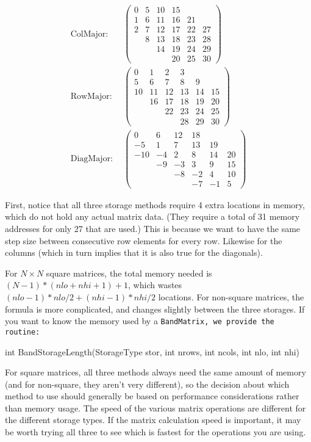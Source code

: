 \begin{align*}
\textrm{ColMajor:} ~ ~ & \left(\begin{array}{cccccc}0 & 5 & 10 & 15 &  &  \\1 & 6 & 11 & 16 & 21 &  \\2 & 7 & 12 & 17 & 22 & 27 \\ & 8 & 13 & 18 & 23 & 28 \\ &  & 14 & 19 & 24 & 29 \\ &  &  & 20 & 25 & 30\end{array}\right) \\
\textrm{RowMajor:} ~  ~ & \left(\begin{array}{cccccc}0 & 1 & 2 & 3 &  &  \\ 5 & 6 & 7 & 8 & 9 &  \\ 10 & 11 & 12 & 13 & 14 & 15 \\ & 16 & 17 & 18 & 19 & 20 \\ &  & 22 & 23 & 24 & 25 \\ &  &  & 28 & 29 & 30\end{array}\right) \\
\textrm{DiagMajor:} ~  ~ & \left(\begin{array}{cccccc}0 & 6 & 12 & 18 &  &  \\-5 & 1 & 7 & 13 & 19 &  \\ -10 & -4 & 2 & 8 & 14 & 20 \\ & -9 & -3 & 3 & 9 & 15 \\ &  & -8 & -2 & 4 & 10 \\ &  &  & -7 & -1 & 5\end{array}\right)
\end{align*}

First, notice that all three storage methods require 4 extra locations in memory, 
which do not hold
any actual matrix data.  
(They require a total of 31 memory addresses for only 27 that are used.)
This is because we want to have the same step size between consecutive row elements
for every row.  Likewise for the columns (which in turn implies that it is also 
true for the diagonals).

For $N\times N$ square matrices, the total memory needed is $(N-1)*(nlo+nhi+1)+1$, 
which wastes $(nlo-1)*nlo/2 + (nhi-1)*nhi/2$ locations.  For non-square
matrices, the formula is more complicated, and changes slightly between the 
three storages.
If you want to know the memory used by a \tt{BandMatrix}, we provide the routine:
\begin{tmvcode}
int BandStorageLength(StorageType stor, int nrows, int ncols, 
        int nlo, int nhi)
\end{tmvcode}
For square matrices, all three methods always need the same amount of memory 
(and for non-square, they aren't very different), so the 
decision about which method to use should generally be based on performance 
considerations rather than memory usage.
The speed of the various matrix operations are different for the different storage 
types.  If the matrix calculation speed is important, it may be worth trying 
all three to see which is fastest for the operations you are using.


